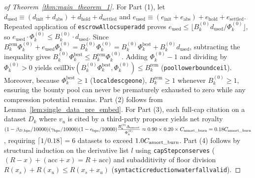 \documentclass[runningheads,a4paper]{llncs}
\renewcommand{\_}{\textunderscore\allowbreak}
\begin{document}
\begin{proof}[of Theorem~\ref{thm:main_theorem_1}]
For Part (1), let $d_{\text{used}} \equiv (d_{\text{init}} + d_{\text{abs}}) + d_{\text{hold}} + d_{\text{settled}}$ and $e_{\text{used}} \equiv (e_{\text{init}} + e_{\text{abs}}) + e_{\text{hold}} + e_{\text{settled}}$. Repeated application of \texttt{escrowAlloc\_superadd} proves $e_{\text{used}} \le \lfloor B_k^{(0)} d_{\text{used}} / \Phi_k^{(0)} \rfloor$, so $e_{\text{used}} \cdot \Phi_k^{(0)} \le B_k^{(0)} \cdot d_{\text{used}}$. Since $B_k^{\text{rem}} \Phi_k^{(0)} + e_{\text{used}} \Phi_k^{(0)} = B_k^{(0)} \Phi_k^{(0)} = B_k^{(0)} \Phi_k^{\text{best}} + B_k^{(0)} d_{\text{used}}$, subtracting the inequality gives $B_k^{(0)} \Phi_k^{\text{best}} \le B_k^{\text{rem}} \Phi_k^{(0)}$. Adding $\Phi_k^{(0)} - 1$ and dividing by $\Phi_k^{(0)} > 0$ yields $\text{ceilDiv}(B_k^{(0)} \Phi_k^{\text{best}},\allowbreak \Phi_k^{(0)}) \le B_k^{\text{rem}}$ (\texttt{pool\_lower\_bound\_ceil}). Moreover, because $\Phi_k^{\text{best}} \ge 1$ (\texttt{local\_desc\_ge\_one}), $B_k^{\text{rem}} \ge 1$ whenever $B_k^{(0)} \ge 1$, ensuring the bounty pool can never be prematurely exhausted to zero while any compression potential remains. Part (2) follows from Lemma~\ref{lem:single_data_pre_embed}. For Part (3), each full-cap citation on a dataset $D_k$ where $v_u$ is cited by a third-party proposer yields net royalty $(1 - \beta_{D,\text{bps}}/10000)(\gamma_{\text{bps}}/10000)(1 - \epsilon_{\text{bps}}/10000) \frac{B_k^{(0)} \Delta_{\text{amort}}}{\Phi_k^{(0)}} \approx 0.90 \times 0.20 \times C_{\text{amort\_burn}} = 0.18 C_{\text{amort\_burn}}$, requiring $\lceil 1 / 0.18 \rceil = 6$ datasets to exceed $1.0 C_{\text{amort\_burn}}$. Part (4) follows by structural induction on the derivative list $l$ using \texttt{capStep\_conserves} ($(R - x) + (\text{acc} + x) = R + \text{acc}$) and subadditivity of floor division $R(x_s) + R(x_u) \le R(x_s + x_u)$ (\texttt{syntactic\_reduction\_waterfall\_valid}).
\end{proof}
\end{document}
